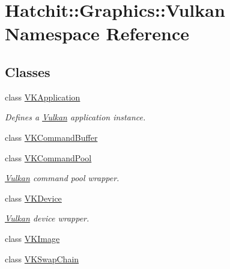 \hypertarget{namespaceHatchit_1_1Graphics_1_1Vulkan}{}\section{Hatchit\+:\+:Graphics\+:\+:Vulkan Namespace Reference}
\label{namespaceHatchit_1_1Graphics_1_1Vulkan}
\subsection*{Classes}
\begin{DoxyCompactItemize}
\item 
class \hyperlink{classHatchit_1_1Graphics_1_1Vulkan_1_1VKApplication}{V\+K\+Application}
\begin{DoxyCompactList}\small\item\em Defines a \hyperlink{namespaceHatchit_1_1Graphics_1_1Vulkan}{Vulkan} application instance. \end{DoxyCompactList}\item 
class \hyperlink{classHatchit_1_1Graphics_1_1Vulkan_1_1VKCommandBuffer}{V\+K\+Command\+Buffer}
\item 
class \hyperlink{classHatchit_1_1Graphics_1_1Vulkan_1_1VKCommandPool}{V\+K\+Command\+Pool}
\begin{DoxyCompactList}\small\item\em \hyperlink{namespaceHatchit_1_1Graphics_1_1Vulkan}{Vulkan} command pool wrapper. \end{DoxyCompactList}\item 
class \hyperlink{classHatchit_1_1Graphics_1_1Vulkan_1_1VKDevice}{V\+K\+Device}
\begin{DoxyCompactList}\small\item\em \hyperlink{namespaceHatchit_1_1Graphics_1_1Vulkan}{Vulkan} device wrapper. \end{DoxyCompactList}\item 
class \hyperlink{classHatchit_1_1Graphics_1_1Vulkan_1_1VKImage}{V\+K\+Image}
\item 
class \hyperlink{classHatchit_1_1Graphics_1_1Vulkan_1_1VKSwapChain}{V\+K\+Swap\+Chain}
\end{DoxyCompactItemize}
